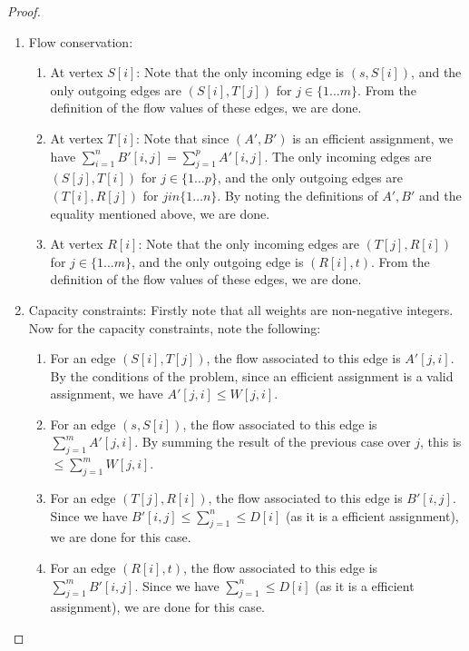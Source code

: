 \documentclass[answers]{exam}
\begin{document}
\begin{questions}
\begin{solution}
\begin{proof}
\begin{enumerate}
    \item Flow conservation:
        \begin{enumerate}
            \item At vertex $S[i]$: Note that the only incoming edge is $(s, S[i])$, and the only outgoing edges are $(S[i], T[j])$ for $j \in \{1\ldots m\}$. From the definition of the flow values of these edges, we are done.
            \item At vertex $T[i]$: Note that since $(A', B')$ is an efficient assignment, we have $\sum_{i = 1}^n B'[i, j] = \sum_{j = 1}^p A'[i, j]$. The only incoming edges are $(S[j], T[i])$ for $j \in \{1\ldots p\}$, and the only outgoing edges are $(T[i], R[j])$ for $j in \{1\ldots n\}$. By noting the definitions of $A', B'$ and the equality mentioned above, we are done.
            \item At vertex $R[i]$: Note that the only incoming edges are $(T[j], R[i])$ for $j \in \{1 \ldots m\}$, and the only outgoing edge is $(R[i], t)$. From the definition of the flow values of these edges, we are done.
        \end{enumerate}
    \item Capacity constraints:
        Firstly note that all weights are non-negative integers. Now for the capacity constraints, note the following:
        \begin{enumerate}
            \item For an edge $(S[i], T[j])$, the flow associated to this edge is $A'[j, i]$. By the conditions of the problem, since an efficient assignment is a valid assignment, we have $A'[j, i] \le W[j, i]$.
            \item For an edge $(s, S[i])$, the flow associated to this edge is $\sum_{j=1}^m A'[j, i]$. By summing the result of the previous case over $j$, this is $\le \sum_{j = 1}^m W[j, i]$.
            \item For an edge $(T[j], R[i])$, the flow associated to this edge is $B'[i, j]$. Since we have $B'[i, j] \le \sum_{j = 1}^n \le D[i]$ (as it is a efficient assignment), we are done for this case.
            \item For an edge $(R[i], t)$, the flow associated to this edge is $\sum_{j = 1}^m B'[i, j]$. Since we have $\sum_{j = 1}^n \le D[i]$ (as it is a efficient assignment), we are done for this case.
        \end{enumerate}
\end{enumerate}


\end{proof}
\end{solution}
\end{questions}
\end{document}
